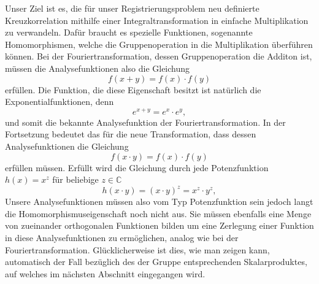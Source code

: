 Unser Ziel ist es, die für unser Registrierungsproblem neu definierte Kreuzkorrelation mithilfe einer Integraltransformation in 
einfache Multiplikation zu verwandeln.
Dafür braucht es spezielle Funktionen, sogenannte Homomorphismen, welche die Gruppenoperation in die Multiplikation überführen 
können. Bei der Fouriertransformation, dessen Gruppenoperation die Additon ist, müssen die Analysefunktionen also die Gleichung 
\begin{equation}
    f(x + y) = f(x) \cdot f(y)
    \label{mellin:hom1}
\end{equation}
erfüllen. 
Die Funktion, die diese Eigenschaft besitzt ist natürlich die Exponentialfunktionen, denn 
\begin{equation}
    e^{x + y} = e^x \cdot e^y,
    \label{mellin:exp}
\end{equation}
und somit die bekannte Analysefunktion der Fouriertransformation.
In der Fortsetzung bedeutet das für die neue Transformation, dass dessen Analysefunktionen die Gleichung
\begin{equation}
    f(x \cdot y) = f(x) \cdot f(y)
    \label{mellin:hom2}
\end{equation}
erfüllen müssen.
Erfüllt wird die Gleichung durch jede Potenzfunktion $h(x) = x^z$ für beliebige $z \in \mathbb{C}$
\begin{equation}
    h(x \cdot y) =  (x \cdot y)^{z} = x^{z} \cdot y^{z},
\end{equation}
Unsere Analysefunktionen müssen also vom Typ Potenzfunktion sein jedoch langt die Homomorphismuseigenschaft noch nicht aus. 
Sie müssen ebenfalls eine Menge von zueinander orthogonalen Funktionen bilden um eine Zerlegung einer Funktion in diese 
Analysefunktionen zu ermöglichen, analog wie bei der Fouriertransformation. 
Glücklicherweise ist dies, wie man zeigen kann, automatisch der Fall bezüglich des der Gruppe entsprechenden Skalarproduktes, 
auf welches im nächsten Abschnitt eingegangen wird.

